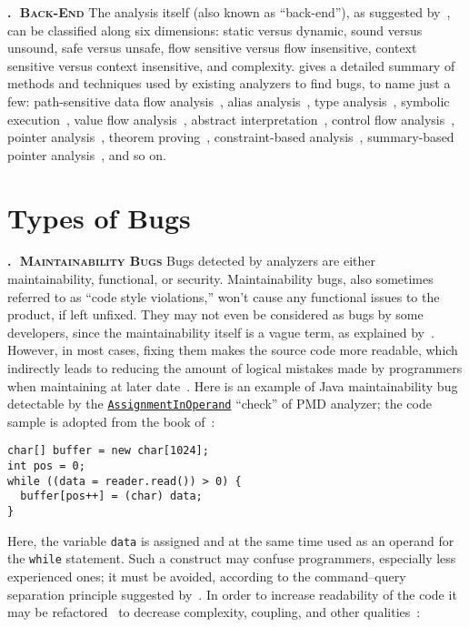 \documentclass[12pt]{article}
\newcommand{\code}[1]{\texttt{#1}}
\newcounter{sector}[section]
\renewcommand\thesector{\thesection.\arabic{sector}}
\newcommand{\sector}[1]{\refstepcounter{sector}\vspace{6pt}\textbf{\textsc{\thesector $\;$ #1}}\quad}
\begin{document}
\sector{Back-End}
The analysis itself (also known as ``back-end''),
as suggested by~\citet{binkley2007source},
can be classified along six dimensions: static versus dynamic, sound versus unsound,
safe versus unsafe, flow sensitive versus flow insensitive,
context sensitive versus context insensitive, and complexity.
\citet{gosain2015static} gives a detailed summary of methods and techniques
used by existing analyzers to find bugs, to name just a few:
path-sensitive data flow analysis~\citep{kremenek2008},
alias analysis~\citep{aliasanalysis},
type analysis~\citep{wand1987simple},
symbolic execution~\citep{Slaby2013AutomaticBT},
value flow analysis~\citep{svf},
abstract interpretation~\citep{Slaby2013AutomaticBT},
control flow analysis~\citep{allen1970control},
pointer analysis~\citep{smaragdakis2015pointer},
theorem proving~\citep{darvas2005theorem},
constraint-based analysis~\citep{ConstraintAnalysis},
summary-based pointer analysis~\citep{PointerAnalysis},
and so on.

\section{Types of Bugs}

\sector{Maintainability Bugs}
Bugs detected by analyzers are either maintainability, functional, or security.
Maintainability bugs, also sometimes referred to as ``code style violations,''
won't cause any functional issues to the product, if left unfixed.
They may not even be considered as bugs by some developers, since
the maintainability itself is a vague term, as explained by~\citet{broy2006demystifying}.
However, in most cases, fixing them makes the source code more readable,
which indirectly leads to
reducing the amount of logical mistakes made by programmers when maintaining at
later date~\citep{posnett2011simpler}.
Here is an example
of Java maintainability bug detectable by the
\href{https://pmd.github.io/latest/pmd_rules_ecmascript_codestyle.html#assignmentinoperand}{\code{AssignmentInOperand}}
``check'' of PMD analyzer; the code sample is adopted
from the book of~\citet[p.475]{sierra2005head}:

\begin{verbatim}
char[] buffer = new char[1024];
int pos = 0;
while ((data = reader.read()) > 0) {
  buffer[pos++] = (char) data;
}
\end{verbatim}

Here, the variable \code{data} is assigned and at the same time used
as an operand for the \code{while} statement. Such a construct
may confuse programmers, especially less experienced ones; it must be avoided,
according to the command–query separation principle suggested by~\citet{meyer1997object}.
In order to increase
readability of the code it may be refactored~\citep{fowler2018refactoring}
to decrease complexity, coupling, and other qualities~\citep{yamashita2012code}:
\end{document}
